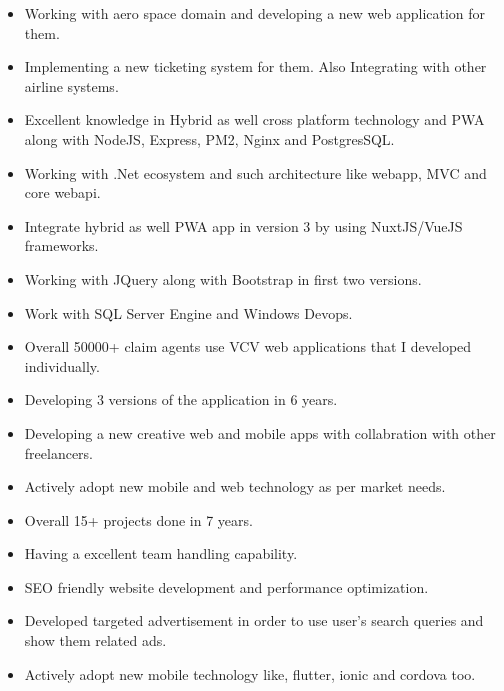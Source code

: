 \documentclass[10pt,a4paper]{altacv}
\begin{document}
\begin{itemize}
\item Working with aero space domain and developing a new web application for them.
\item Implementing a new ticketing system for them. Also Integrating with other airline systems.
\item Excellent knowledge in Hybrid as well cross platform technology and PWA along with NodeJS, Express, PM2, Nginx and PostgresSQL.
\end{itemize}
\begin{itemize}
\item Working with .Net ecosystem and such architecture like webapp, MVC and core webapi.
\item Integrate hybrid as well PWA app in version 3 by using NuxtJS/VueJS frameworks.
\item Working with JQuery along with Bootstrap in first two versions.
\item Work with SQL Server Engine and Windows Devops.
\item Overall 50000+ claim agents use VCV web applications that I developed individually.
\item Developing 3 versions of the application in 6 years.
\end{itemize}
\begin{itemize}
\item Developing a new creative web and mobile apps with collabration with other freelancers.
\item Actively adopt new mobile and web technology as per market needs.
\item Overall 15+ projects done in 7 years.
\item Having a excellent team handling capability.
\item SEO friendly website development and performance optimization.
\item Developed targeted advertisement in order to use user's search queries and show them related ads.
\item Actively adopt new mobile technology like, flutter, ionic and cordova too.

\end{itemize}
\end{document}
